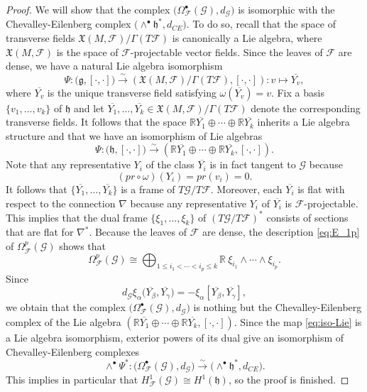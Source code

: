 \documentclass[10pt,a4paper]{amsart}
\begin{document}
\begin{proof}
		We will show that the complex  $\big(\Omega^{\bullet}_{\mathcal{F}}(\mathcal{G}),d_{\mathcal{G}}\big)$ is isomorphic with the Chevalley-Eilenberg complex $\big(\wedge^{\bullet}\mathfrak{h}^{*},d_{CE}\big)$.
		To do so, recall that the space of transverse fields $\mathfrak{X}(M,\mathcal{F})/\Gamma(T\mathcal{F})$ is canonically a Lie algebra, where $\mathfrak{X}(M,\mathcal{F})$ is the space of $\mathcal{F}$-projectable vector fields. Since the leaves of $\mathcal{F}$ are dense, we have a natural Lie algebra isomorphism
		\[
		\Psi:\big(\mathfrak{g},[\cdot,\cdot]\big)\overset{\sim}{\longrightarrow}\left(\mathfrak{X}(M,\mathcal{F})/\Gamma(T\mathcal{F}),[\cdot,\cdot]\right):v\mapsto \overline{Y_v},
		\]
		where $\overline{Y_v}$ is the unique transverse field satisfying $\omega(\overline{Y_v})=v$.
		Fix a basis $\{v_1,\ldots,v_k\}$ of $\mathfrak{h}$ and let $\overline{Y_1},\ldots,\overline{Y_k}\in\mathfrak{X}(M,\mathcal{F})/\Gamma(T\mathcal{F})$ denote the corresponding transverse fields.
		It follows that the space $\mathbb{R}\overline{Y_1}\oplus\cdots\oplus\mathbb{R}\overline{Y_k}$ inherits a Lie algebra structure and that we have an isomorphism of Lie algebras
		\begin{equation}\label{eq:iso-Lie}
			\Psi:\big(\mathfrak{h},[\cdot,\cdot]\big)\overset{\sim}{\longrightarrow}\left(\mathbb{R}\overline{Y_1}\oplus\cdots\oplus\mathbb{R}\overline{Y_k},[\cdot,\cdot]\right).
		\end{equation}
		Note that any representative $Y_i$ of the class $\overline{Y_i}$ is in fact tangent to $\mathcal{G}$ because
		\[
		(pr\circ\omega)(Y_i)=pr(v_i)=0.
		\]
		It follows that $\{\overline{Y_1},\ldots,\overline{Y_k}\}$ is a frame of $T\mathcal{G}/T\mathcal{F}$. Moreover, each  $\overline{Y_i}$ is flat with respect to the connection $\nabla$ because any representative $Y_i$ of $\overline{Y_i}$ is $\mathcal{F}$-projectable. This implies that the dual frame $\{\xi_1,\ldots,\xi_k\}$ of $(T\mathcal{G}/T\mathcal{F})^{*}$ consists of sections that are flat for $\nabla^{*}$. Because the leaves of $\mathcal{F}$ are dense, the description \eqref{eq:E_1p} of $\Omega^{p}_{\mathcal{F}}(\mathcal{G})$ shows that
		\[
		\Omega^{p}_{\mathcal{F}}(\mathcal{G})\cong\bigoplus_{1\leq i_1<\cdots<i_p\leq k}\mathbb{R}~\xi_{i_1}\wedge\cdots\wedge\xi_{i_p}.
		\]
		Since 
		\[
		d_{\mathcal{G}}\xi_\alpha\big(\overline{Y_\beta},\overline{Y_\gamma}\big)=-\xi_{\alpha}[\overline{Y_\beta},\overline{Y_\gamma}],
		\]
		we obtain that the complex $\big(\Omega^{\bullet}_{\mathcal{F}}(\mathcal{G}),d_{\mathcal{G}}\big)$ is nothing but the Chevalley-Eilenberg complex of the Lie algebra $\left(\mathbb{R}\overline{Y_1}\oplus\cdots\oplus\mathbb{R}\overline{Y_k},[\cdot,\cdot]\right)$. Since the map \eqref{eq:iso-Lie} is a Lie algebra isomorphism, exterior powers of its dual give an isomorphism of Chevalley-Eilenberg complexes
		\[
		\wedge^{\bullet}\Psi^{*}:\big(\Omega^{\bullet}_{\mathcal{F}}(\mathcal{G}),d_{\mathcal{G}}\big)\overset{\sim}{\longrightarrow}\big(\wedge^{\bullet}\mathfrak{h}^{*},d_{CE}\big).
		\]
		This implies in particular that $H^{1}_{\mathcal{F}}(\mathcal{G})\cong H^{1}(\mathfrak{h})$, so the proof is finished.
	\end{proof}
\end{document}

